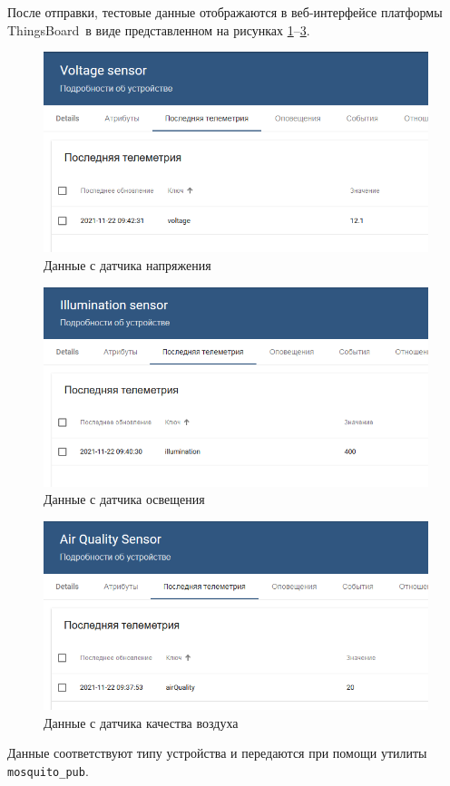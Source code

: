 \documentclass[a4paper,14pt]{extarticle}
\newcommand{\tb}{ThingsBoard~}
\begin{document}
После отправки, тестовые данные отображаются в веб-интерфейсе платформы \tb в виде представленном на рисунках \ref{fig:voltagedata}--\ref{fig:airqualitydata}. 
\begin{figure}[h!]
	\centering
	\includegraphics[width=0.7\linewidth]{images/VoltageData}
	\caption{Данные с датчика напряжения}
	\label{fig:voltagedata}
\end{figure}
\begin{figure}[h!]
	\centering
	\includegraphics[width=0.7\linewidth]{images/IlluminationData}
	\caption{Данные с датчика освещения}
	\label{fig:illuminationdata}
\end{figure}
\begin{figure}[h!]
	\centering
	\includegraphics[width=0.7\linewidth]{images/airQualityData}
	\caption{Данные с датчика качества воздуха}
	\label{fig:airqualitydata}
\end{figure}


Данные соответствуют типу устройства и передаются при помощи утилиты \texttt{mosquito\_pub}.
\end{document}
